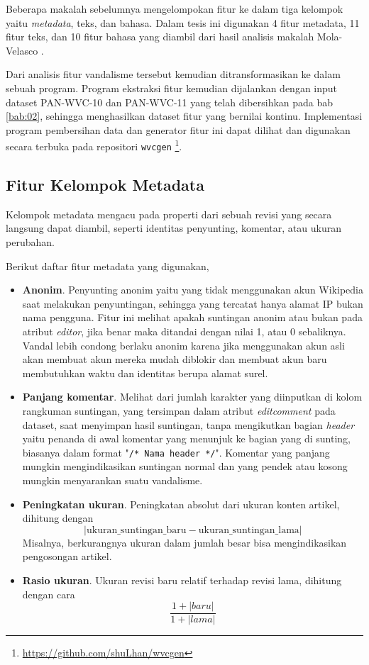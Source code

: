Beberapa makalah sebelumnya mengelompokan fitur ke dalam tiga kelompok yaitu
\textit{metadata}, teks, dan bahasa.
Dalam tesis ini digunakan 4 fitur metadata, 11 fitur teks, dan 10 fitur
bahasa yang diambil dari hasil analisis makalah Mola-Velasco
\cite{mola2012wikipedia}.

Dari analisis fitur vandalisme tersebut kemudian ditransformasikan ke dalam
sebuah program.
Program ekstraksi fitur kemudian dijalankan dengan input dataset PAN-WVC-10
dan PAN-WVC-11 yang telah dibersihkan pada bab \ref{bab:02},
sehingga menghasilkan dataset fitur yang bernilai kontinu.
Implementasi program pembersihan data dan generator fitur ini dapat dilihat dan
digunakan secara terbuka pada repositori \texttt{wvcgen}
\footnote{\url{https://github.com/shuLhan/wvcgen}}.

\subsection{Fitur Kelompok Metadata}

Kelompok metadata mengacu pada properti dari sebuah revisi yang secara langsung
dapat diambil, seperti identitas penyunting, komentar, atau ukuran perubahan.

Berikut daftar fitur metadata yang digunakan,

\begin{itemize}

\item \textbf{Anonim}.
Penyunting anonim yaitu yang tidak menggunakan akun Wikipedia saat melakukan
penyuntingan, sehingga yang tercatat hanya alamat IP bukan nama pengguna.
Fitur ini melihat apakah suntingan anonim atau bukan pada atribut
\textit{editor}, jika benar maka ditandai dengan nilai 1, atau 0 sebaliknya.
Vandal lebih condong berlaku anonim karena jika menggunakan akun asli akan
membuat akun mereka mudah diblokir dan membuat akun baru membutuhkan waktu dan
identitas berupa alamat surel.

\item \textbf{Panjang komentar}.
Melihat dari jumlah karakter yang diinputkan di kolom rangkuman suntingan, yang
tersimpan dalam atribut \textit{editcomment} pada dataset, saat menyimpan hasil
suntingan, tanpa mengikutkan bagian \textit{header} yaitu penanda di awal
komentar yang menunjuk ke bagian yang di sunting, biasanya dalam format
"\texttt{/* Nama header */}".
Komentar yang panjang mungkin mengindikasikan suntingan normal dan yang pendek
atau kosong mungkin menyarankan suatu vandalisme.

\item \textbf{Peningkatan ukuran}.
Peningkatan absolut dari ukuran konten artikel, dihitung dengan
\[
|\text{ukuran\_suntingan\_baru} - \text{ukuran\_suntingan\_lama}|
\]
Misalnya, berkurangnya ukuran dalam jumlah besar bisa mengindikasikan
pengosongan artikel.

\item \textbf{Rasio ukuran}.
Ukuran revisi baru relatif terhadap revisi lama, dihitung dengan cara
\[
\frac{1 + |baru|}{1 + |lama|}
\]

\end{itemize}


